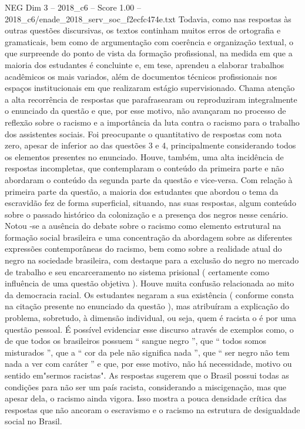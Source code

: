 \begin{textsample}{NEG Dim 3 – 2018\_c6 – Score 1.00 – 2018\_c6/enade\_2018\_serv\_soc\_f2ecfc474e.txt}
Todavia, como nas respostas às outras questões discursivas, os textos continham muitos erros de ortografia e gramaticais, bem como de argumentação com coerência e organização textual, o que surpreende do ponto de vista da formação profissional, na medida em que a maioria dos estudantes é concluinte e, em tese, aprendeu a elaborar trabalhos acadêmicos os mais variados, além de documentos técnicos profissionais nos espaços institucionais em que realizaram estágio supervisionado.
Chama atenção a alta recorrência de respostas que parafrasearam ou reproduziram integralmente o enunciado da questão e que, por esse motivo, não avançaram no processo de reflexão sobre o racismo e a importância da luta contra o racismo para o trabalho dos assistentes sociais.
Foi preocupante o quantitativo de respostas com nota zero, apesar de inferior ao das questões 3 e 4, principalmente considerando todos os elementos presentes no enunciado.
Houve, também, uma alta incidência de respostas incompletas, que contemplaram o conteúdo da primeira parte e não abordaram o conteúdo da segunda parte da questão e vice-versa.
Com relação à primeira parte da questão, a maioria dos estudantes que abordou o tema da escravidão fez de forma superficial, situando, nas suas respostas, algum conteúdo sobre o passado histórico da colonização e a presença dos negros nesse cenário.
Notou -se a ausência do debate sobre o racismo como elemento estrutural na formação social brasileira e uma concentração da abordagem sobre as diferentes expressões contemporâneas do racismo, bem como sobre a realidade atual do negro na sociedade brasileira, com destaque para a exclusão do negro no mercado de trabalho e seu encarceramento no sistema prisional ( certamente como influência de uma questão objetiva ).
Houve muita confusão relacionada ao mito da democracia racial.
Os estudantes negaram a sua existência ( conforme consta na citação presente no enunciado da questão ), mas atribuíram a explicação do problema, sobretudo, à dimensão individual, ou seja, quem é racista o é por uma questão pessoal.
É possível evidenciar esse discurso através de exemplos como, o de que todos os brasileiros possuem “ sangue negro ”, que “ todos somos misturados ”, que a “ cor da pele não significa nada ”, que “ ser negro não tem nada a ver com caráter ” e que, por esse motivo, não há necessidade, motivo ou sentido em"sermos racistas".
As respostas sugerem que o Brasil possui todas as condições para não ser um país racista, considerando a miscigenação, mas que apesar dela, o racismo ainda vigora.
Isso mostra a pouca densidade crítica das respostas que não ancoram o escravismo e o racismo na estrutura de desigualdade social no Brasil.

\end{textsample}
